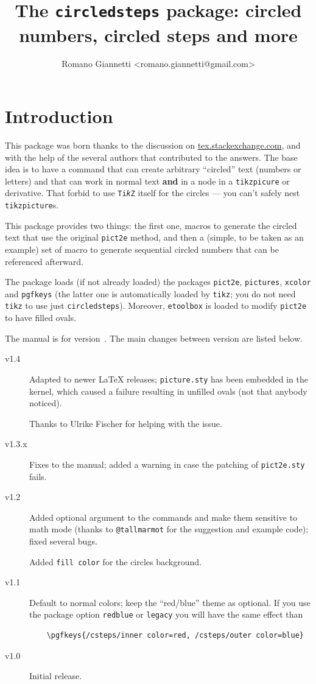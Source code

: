 \documentclass{ltxdoc}
\title{The \texttt{circledsteps} package: circled numbers, circled steps and more}
\author{Romano Giannetti <romano.giannetti@gmail.com>}
\begin{document}
\maketitle

\section{Introduction}

This package was born thanks to the discussion on \href{https://tex.stackexchange.com/questions/7032/good-way-to-make-textcircled-numbers}{tex.stackexchange.com}, and with the help of the several authors that contributed to the answers. The base idea is to have a command that can create arbitrary ``circled'' text (numbers or letters) and that can work in normal text \textbf{and} in a node in a \texttt{tikzpicure} or derivative. That forbid to use \texttt{Ti\emph{k}Z} itself for the circles --- you can't safely nest \texttt{tikzpicture}s.

This package provides two things: the first one, macros to generate the circled text that use the original \texttt{pict2e} method, and then a (simple, to be taken as an example) set of macro to generate sequential circled numbers that can be referenced afterward.

The package loads (if not already loaded) the packages \texttt{pict2e}, \texttt{pictures}, \texttt{xcolor} and \texttt{pgfkeys} (the latter one is automatically loaded by \texttt{tikz}; you do not need \texttt{tikz} to use just \texttt{circledsteps}). Moreover, \texttt{etoolbox} is loaded to modify \texttt{pict2e} to have filled ovals.

The manual is for version~\cstepsversion. The main changes between version are listed below.
\begin{description}
    \item[v1.4] Adapted to newer LaTeX releases; \texttt{picture.sty} has been embedded in the kernel, which caused a failure resulting in unfilled ovals (not that anybody noticed).

        Thanks to Ulrike Fischer for helping with the issue.
    \item[v1.3.x] Fixes to the manual; added a warning in case the patching of \texttt{pict2e.sty} fails.
    \item[v1.2] Added optional argument to the commands and make them sensitive to math mode (thanks to \texttt{@tallmarmot} for the suggestion and example code); fixed several bugs.

        Added \texttt{fill color} for the circles background.
    \item[v1.1] Default to normal colors; keep the ``red/blue'' theme as optional.
        If you use the package option \texttt{redblue} or \texttt{legacy} you will have the same effect than
        \begin{lstlisting}
    \pgfkeys{/csteps/inner color=red, /csteps/outer color=blue}
        \end{lstlisting}
    \item[v1.0] Initial release.
\end{description}
\end{document}
